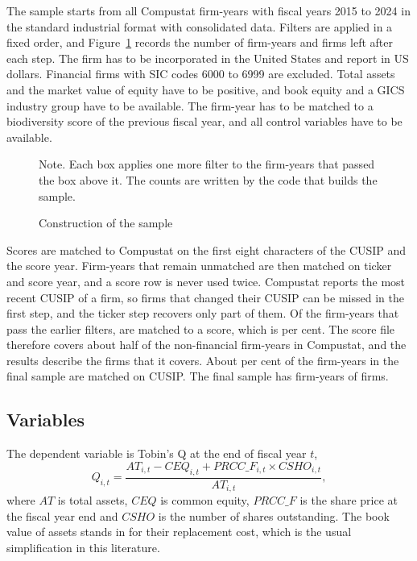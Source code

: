 \documentclass[12pt,a4paper]{article}
\newcommand{\tablenote}[1]{\par\smallskip\begin{minipage}{\linewidth}\footnotesize\setstretch{1.05}#1\end{minipage}}
\begin{document}
The sample starts from all Compustat firm-years with fiscal years 2015 to 2024 in the standard industrial format with consolidated data. Filters are applied in a fixed order, and Figure~\ref{fig:sample} records the number of firm-years and firms left after each step. The firm has to be incorporated in the United States and report in US dollars. Financial firms with SIC codes 6000 to 6999 are excluded. Total assets and the market value of equity have to be positive, and book equity and a GICS industry group have to be available. The firm-year has to be matched to a biodiversity score of the previous fiscal year, and all control variables have to be available.

\begin{figure}[!htbp]
\centering

\caption{Construction of the sample}\label{fig:sample}
\tablenote{Note. Each box applies one more filter to the firm-years that passed the box above it. The counts are written by the code that builds the sample.}
\end{figure}

Scores are matched to Compustat on the first eight characters of the CUSIP and the score year. Firm-years that remain unmatched are then matched on ticker and score year, and a score row is never used twice. Compustat reports the most recent CUSIP of a firm, so firms that changed their CUSIP can be missed in the first step, and the ticker step recovers only part of them. Of the \nGics{} firm-years that pass the earlier filters, \nMatched{} are matched to a score, which is \pctMatched{} per cent. The score file therefore covers about half of the non-financial firm-years in Compustat, and the results describe the firms that it covers. About \pctCusip{} per cent of the firm-years in the final sample are matched on CUSIP. The final sample has \nFinal{} firm-years of \nFirmsFinal{} firms.

\subsection{Variables}

The dependent variable is Tobin's Q at the end of fiscal year $t$,
\begin{equation}
Q_{i,t} = \frac{AT_{i,t} - CEQ_{i,t} + PRCC\_F_{i,t} \times CSHO_{i,t}}{AT_{i,t}},
\end{equation}
where $AT$ is total assets, $CEQ$ is common equity, $PRCC\_F$ is the share price at the fiscal year end and $CSHO$ is the number of shares outstanding. The book value of assets stands in for their replacement cost, which is the usual simplification in this literature.
\end{document}
